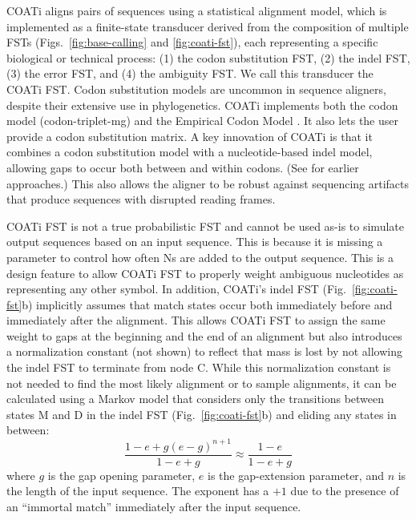 \documentclass[12pt,letterpaper]{article}
\begin{document}
COATi aligns pairs of sequences using a statistical alignment model, which is implemented as a finite-state transducer derived from the composition of multiple FSTs (Figs.~\ref{fig:base-calling} and \ref{fig:coati-fst}), each representing a specific biological or technical process: (1) the codon substitution FST, (2) the indel FST, (3) the error FST, and (4) the ambiguity FST. We call this transducer the COATi FST. Codon substitution models are uncommon in sequence aligners, despite their extensive use in phylogenetics. COATi implements both the \cite{muse_gaut_1994} codon model (codon-triplet-mg) and the Empirical Codon Model \citep[codon-triplet-ecm;][]{kosiol_ECM_2007}.
It also lets the user provide a codon substitution matrix. A key innovation of COATi is that it combines a codon substitution model with a nucleotide-based indel model, allowing gaps to occur both between and within codons. (See \citealt{hein1994algorithm,arvestad1997aligning,pedersen1998comparison,ranwez_macse_2011,ranwez_macse_2018} for earlier approaches.) This also allows the aligner to be robust against sequencing artifacts that produce sequences with disrupted reading frames.

COATi FST is not a true probabilistic FST \citep{cotterell-etal-2014-stochastic} and cannot be used as-is to simulate output sequences based on an input sequence. This is because it is missing a parameter to control how often Ns are added to the output sequence. This is a design feature to allow COATi FST to properly weight ambiguous nucleotides as representing any other symbol. In addition, COATi's indel FST (Fig.~\ref{fig:coati-fst}b) implicitly assumes that match states occur both immediately before and immediately after the alignment. This allows COATi FST to assign the same weight to gaps at the beginning and the end of an alignment but also introduces a normalization constant (not shown) to reflect that mass is lost by not allowing the indel FST to terminate from node C. While this normalization constant is not needed to find the most likely alignment or to sample alignments, it can be calculated using a Markov model that considers only the transitions between states M and D in the indel FST (Fig.~\ref{fig:coati-fst}b) and eliding any states in between:
\[
\frac{1-e + g(e-g)^{n+1}}{1-e+g} \approx \frac{1-e}{1-e+g} 
\]
where $g$ is the gap opening parameter, $e$ is the gap-extension parameter, and $n$ is the length of the input sequence. The exponent has a $+1$ due to the presence of an ``immortal match'' immediately after the input sequence.
\end{document}
